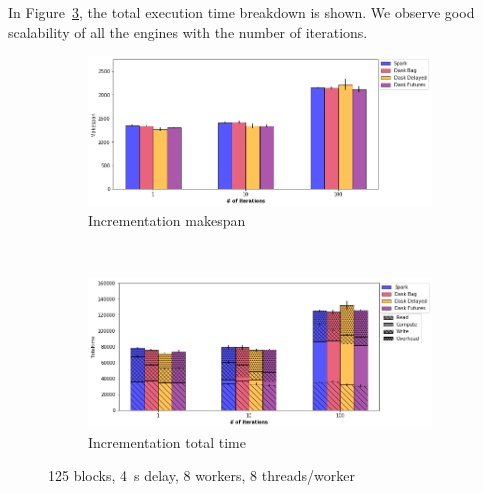 \documentclass[conference]{IEEEtran}
\begin{document}
In Figure~\ref{fig:inc_tt_itr}, the total execution time breakdown is
shown. We observe good scalability of all the engines with the number of
iterations.



\begin{figure}[!t]
    \centering
    \begin{subfigure}[b]{\columnwidth}
        \includegraphics[clip,width=\columnwidth]{images/inc_itr.png}%
        \caption{Incrementation makespan}\label{fig:inc_ms_itr}
    \end{subfigure}
    \\
    \begin{subfigure}[b]{\columnwidth}
        \includegraphics[clip,width=\columnwidth]{images/inc_idle_itr.png}%
        \caption{Incrementation total time}\label{fig:inc_tt_itr}
    \end{subfigure}
    \caption{125 blocks, \SI{4}{\second} delay, 8 workers, 8 threads/worker}
\end{figure}
\end{document}
